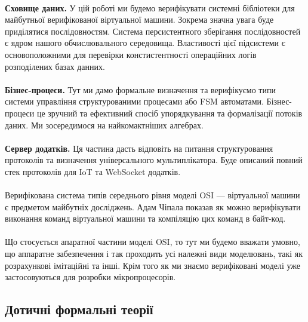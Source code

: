 \documentclass[11pt,oneside]{article}
\begin{document}
   \paragraph{}
   {\bf Сховище даних.} У цій роботі ми будемо верифікувати системні бібліотеки для
   майбутньої верифікованої віртуальної машини. Зокрема значна увага буде приділятися
   послідовностям. Система персистентного зберігання послідовностей є ядром нашого
   обчислювального середовища. Властивості цієї підсистеми є основоположними
   для перевірки констистентності операційних логів розподілених базах данних.

   \paragraph{}
   {\bf Бізнес-процеси.} Тут ми дамо формальне визначення та верифікуємо
   типи системи управління структурованими процесами або FSM автоматами.
   Бізнес-процеси це зручний та ефективний спосіб упорядкування та формалізації
   потоків даних. Ми зосередимося на найкомактніших алгебрах.

   \paragraph{}
   {\bf Сервер додатків.} Ця частина дасть відповіть на питання структуровання
   протоколів та визначення універсального мультиплікатора. Буде описаний повний стек
   протоколів для IoT та WebSocket додатків.

   \newpage
   \paragraph{}
   Верифікована система типів середнього рівня моделі OSI --- віртуальної машини
   є предметом майбутніх досліджень. Адам Чіпала \cite{chipvm} показав як можно
   верифікувати виконання команд віртуальної машини та компіляцію цих команд в байт-код.

   \paragraph{}
   Що стосується апаратної частини моделі OSI, то тут ми будемо вважати умовно,
   що аппаратне забезпечення і так проходить усі належні види моделювань, такі як
   розрахункові імітаційні та інші. Крім того як ми знаємо верифіковані моделі уже застосовуються
   для розробки мікропроцесорів.

\subsection*{Дотичні формальні теорії}
\end{document}
